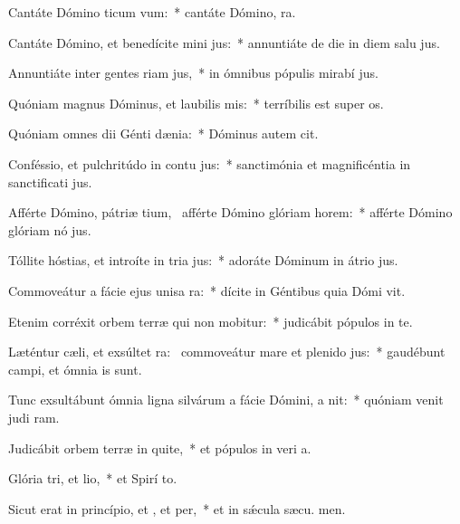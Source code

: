 \item Cantáte Dómino ticum vum:~* cantáte Dómino,  ra.
\item Cantáte Dómino, et benedícite mini jus:~* annuntiáte de die in diem salu jus.
\item Annuntiáte inter gentes riam jus,~* in ómnibus pópulis mirabí jus.
\item Quóniam magnus Dóminus, et laubilis mis:~* terríbilis est super  os.
\item Quóniam omnes dii Génti dænia:~* Dóminus autem  cit.
\item Conféssio, et pulchritúdo in contu jus:~* sanctimónia et magnificéntia in sanctificati jus.
\item Afférte Dómino, pátriæ tium,~\pscross{} afférte Dómino glóriam  horem:~* afférte Dómino glóriam nó jus.
\item Tóllite hóstias, et introíte in tria jus:~* adoráte Dóminum in átrio  jus.
\item Commoveátur a fácie ejus unisa ra:~* dícite in Géntibus quia Dómi vit.
\item Etenim corréxit orbem terræ qui non mobitur:~* judicábit pópulos in te.
\item Læténtur cæli, et exsúltet ra:~\pscross{} commoveátur mare et plenido jus:~* gaudébunt campi, et ómnia   is sunt.
\item Tunc exsultábunt ómnia ligna silvárum a fácie Dómini, a nit:~* quóniam venit judi ram.
\item Judicábit orbem terræ in quite,~* et pópulos in veri a.
\item Glória tri, et lio,~* et Spirí to.
\item Sicut erat in princípio, et , et per,~* et in sǽcula sæcu. men.

